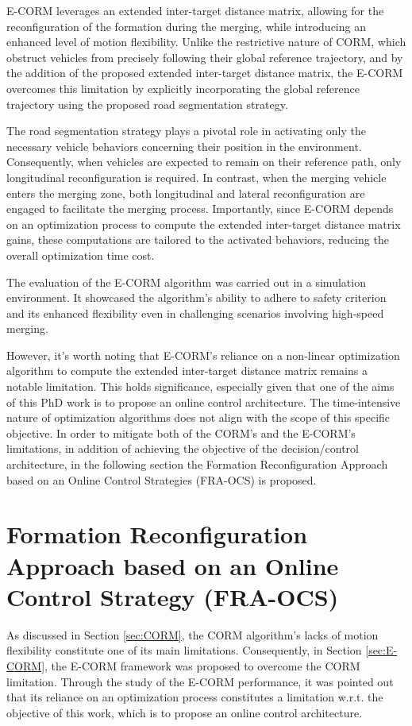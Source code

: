 E-CORM leverages an extended inter-target distance matrix, allowing for the reconfiguration of the formation during the merging, while introducing an enhanced level of motion flexibility. Unlike the restrictive nature of CORM, which obstruct vehicles from precisely following their global reference trajectory, and by the addition of the proposed extended inter-target distance matrix, the E-CORM overcomes this limitation by explicitly incorporating the global reference trajectory using the proposed road segmentation strategy. 

The road segmentation strategy plays a pivotal role in activating only the necessary vehicle behaviors concerning their position in the environment. Consequently, when vehicles are expected to remain on their reference path, only longitudinal reconfiguration is required. In contrast, when the merging vehicle enters the merging zone, both longitudinal and lateral reconfiguration are engaged to facilitate the merging process. Importantly, since E-CORM depends on an optimization process to compute the extended inter-target distance matrix gains, these computations are tailored to the activated behaviors, reducing the overall optimization time cost.



The evaluation of the E-CORM algorithm was carried out in a simulation environment. It showcased the algorithm's ability to adhere to safety criterion and its enhanced flexibility even in challenging scenarios involving high-speed merging. 


However, it's worth noting that E-CORM's reliance on a non-linear optimization algorithm to compute the extended inter-target distance matrix remains a notable limitation. This holds significance, especially given that one of the aims of this PhD work is to propose an online control architecture. The time-intensive nature of optimization algorithms does not align with the scope of this specific objective. In order to mitigate both of the CORM's and the E-CORM's limitations, in addition of achieving the objective of the decision/control architecture, in the following section the Formation Reconfiguration Approach based on an Online Control Strategies (FRA-OCS) is proposed. 


\section{Formation Reconfiguration Approach based on an Online Control Strategy (FRA-OCS)} \label{sec:No-opt}
As discussed in Section \ref{sec:CORM}, the CORM algorithm's lacks of motion flexibility constitute one of its main limitations. Consequently, in Section \ref{sec:E-CORM}, the E-CORM framework was proposed to overcome the CORM limitation. Through the study of the E-CORM performance, it was pointed out that its reliance on an optimization process constitutes a limitation w.r.t. the objective of this work, which is to propose an online control architecture. 

